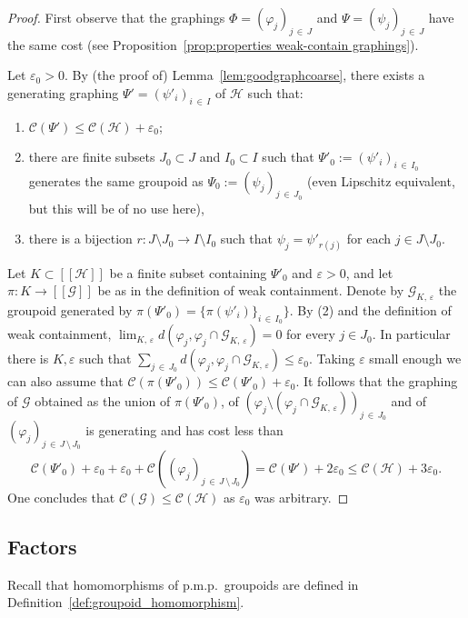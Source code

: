 \documentclass[10pt]{amsart}
\theoremstyle{definition}
\newcommand{\cH}{\mathcal{H}}
\newcommand{\cost}{\mathcal{C}}
\newcommand{\ch}{\mathcal{H}}
\newcommand{\cg}{\mathcal{G}}
\newcommand{\eps}{\varepsilon}
\newcommand{\ph}{\varphi}
\newcommand{\pmp}{p.m.p.\ }
\begin{document}
\begin{proof}
First observe that the graphings $\Phi=(\ph_j)_{j\,\in \,J}$ and $\Psi=(\psi_j)_{j\,\in\,J}$ have the same cost (see Proposition~\ref{prop:properties weak-contain graphings}).

Let $\eps_0>0$. By (the proof of) Lemma~\ref{lem:goodgraphcoarse}, there exists a generating graphing $\Psi'=(\psi'_i)_{i\,\in\,I}$ of $\ch$ such that:
\begin{enumerate}
\item \label{prooftheo3.22.1}$\cost (\Psi')\leq \cost(\ch)+\eps_0$;
\item \label{prooftheo3.22.2}there are finite subsets $J_0\subset J$ and $I_0\subset I$ such that $\Psi'_{0}:=(\psi'_i)_{i\,\in\,I_0}$ generates the same groupoid as $\Psi_{0}:=(\psi_j)_{j\,\in\,J_0}$ (even Lipschitz equivalent, but this will be of no use here),
\item \label{prooftheo3.22.3}there is a bijection $r:J\setminus J_0\to I\setminus I_0$ such that $\psi_j=\psi'_{r(j)}$ for each $j\in J \setminus J_0$.
\end{enumerate}
Let $K \subset[[\cH]]$ be a finite subset containing $\Psi'_0$ and $\eps>0$, and let $\pi \colon K \to [[\cg]]$ be as in the definition of weak containment. Denote by $\cg_{K,\,\eps}$ the groupoid generated by $\pi(\Psi'_0)=\{ \pi(\psi'_i)\}_{i\,\in\,I_0}\}$. By (2) and the definition of weak containment, $\lim_{K,\,\eps} d(\ph_j,\ph_j \cap \cg_{K,\,\eps})=0$ for every $j \in J_0$. In particular there is $K,\eps$ such that $\sum_{j\,\in\,J_0} d(\ph_j,\ph_j \cap \cg_{K,\,\eps}) \leq \eps_0$. Taking $\eps$ small enough we can also assume that $\cost(\pi(\Psi'_0)) \leq \cost(\Psi'_0)+\eps_0$. It follows that the graphing of $\cg$ obtained as the union of $\pi(\Psi'_0)$, of $(\ph_j \setminus (\ph_j \cap \cg_{K,\,\eps}))_{j\,\in\,J_0}$ and of $(\ph_j)_{j\,\in\,J\,\setminus\,J_0}$ is generating and has cost less than
\[
\cost\left(\Psi'_0\right)+\eps_0+\eps_0 + \cost\left((\ph_j)_{j\,\in\,J\,\setminus\,J_0}\right) = \cost(\Psi')+2\eps_0 \leq \cost(\ch)+3\eps_0.
\]
One concludes that $\cost(\cg) \leq \cost(\ch)$ as $\eps_0$ was arbitrary.
\end{proof}

\pagebreak

\subsection{Factors}

Recall that homomorphisms of \pmp groupoids are defined in Definition~\ref{def:groupoid_homomorphism}.
\end{document}

